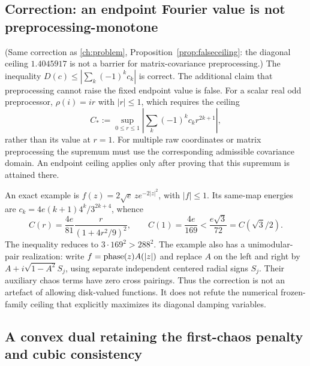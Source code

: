 \subsection{Correction: an endpoint Fourier value is not preprocessing-monotone}
\label{sec:damping-correction}
(Same correction as \autoref{ch:problem}, Proposition~\ref{prop:falseceiling}: the diagonal ceiling $1.4045917$ is not a barrier for matrix-covariance preprocessing.)
The inequality $D(c)\le|\sum_k(-1)^kc_k|$ is correct. The additional
claim that preprocessing cannot raise the fixed endpoint value is false.
For a scalar real odd preprocessor, $\rho(i)=ir$ with $|r|\le1$, which
requires the ceiling
\[
C_*:=\sup_{0\le r\le1}\left|\sum_k(-1)^kc_kr^{2k+1}\right|,
\]
rather than its value at $r=1$. For multiple raw coordinates or matrix
preprocessing the supremum must use the corresponding admissible
covariance domain. An endpoint ceiling applies only after proving that
this supremum is attained there.

An exact example is $f(z)=2\sqrt e\,z e^{-2|z|^2}$, with $|f|\le1$.
Its same-map energies are $c_k=4e(k+1)4^k/3^{2k+4}$, whence
\[
C(r)=\frac{4e}{81}\frac{r}{(1+4r^2/9)^2},\qquad
C(1)=\frac{4e}{169}<\frac{e\sqrt3}{72}=C(\sqrt3/2).
\]
The inequality reduces to $3\cdot169^2>288^2$. The example also has a
unimodular-pair realization: write $f=\operatorname{phase}(z)A(|z|)$ and replace $A$ on
the left and right by $A+i\sqrt{1-A^2}S_j$, using separate independent
centered radial signs $S_j$. Their auxiliary chaos terms have zero
cross pairings. Thus the correction is not an artefact of allowing
disk-valued functions. It does not refute the numerical frozen-family
ceiling that explicitly maximizes its diagonal damping variables.

\subsection{A convex dual retaining the first-chaos penalty and cubic consistency}
\label{sec:Kprime-dual}

